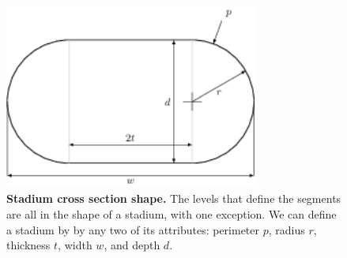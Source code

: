 \documentclass[10pt]{article}
\begin{document}
\begin{figure}[!ht]
  \begin{center}
    \includegraphics[width=3.27in]{figfactory/stadium.png}
  \end{center}
  \caption{
    {\bf Stadium cross section shape.}  The levels that define the segments are
    all in the shape of a stadium, with one exception. We can define a stadium
    by by any two of its attributes: perimeter $p$, radius $r$, thickness $t$,
    width $w$, and depth $d$.
  }
  \label{fig:stadium}
\end{figure}
\end{document}
